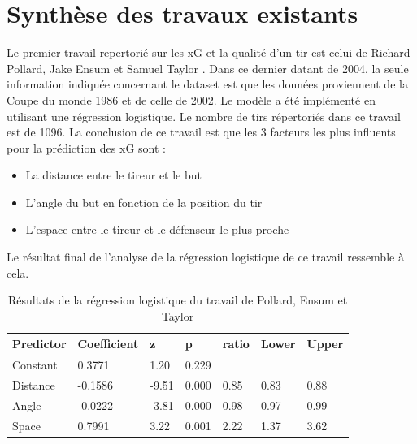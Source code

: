 \documentclass[12pt]{article}
\begin{document}
\newpage
\section{Synthèse des travaux existants}
\label{sec:synthese}
Le premier travail repertorié sur les xG et la qualité d'un tir est celui de Richard Pollard, Jake Ensum et Samuel Taylor \cite{pollardEstimatingProbabilityShot2004}.
Dans ce dernier datant de 2004, la seule information indiquée concernant le dataset est que les données proviennent de la Coupe du monde 1986 et de celle de 2002.
Le modèle a été implémenté en utilisant une régression logistique.
Le nombre de tirs répertoriés dans ce travail est de 1096.
La conclusion de ce travail est que les 3 facteurs les plus influents pour la prédiction des xG sont :
\begin{itemize}
    \item La distance entre le tireur et le but
    \item L'angle du but en fonction de la position du tir
    \item L'espace entre le tireur et le défenseur le plus proche
\end{itemize}
Le résultat final de l'analyse de la régression logistique de ce travail ressemble à cela.
\begin{table}[htp]
    \centering
    \begin{tabular}{|l|l|l|l|l|l|l|}
        \hline
        \textbf{Predictor} & \textbf{Coefficient} & \textbf{z} & \textbf{p} & \textbf{ratio} & \textbf{Lower} & \textbf{Upper} \\ \hline
        Constant           & 0.3771               & 1.20       & 0.229      &                &                &                \\ \hline
        Distance           & -0.1586              & -9.51      & 0.000      & 0.85           & 0.83           & 0.88           \\ \hline
        Angle              & -0.0222              & -3.81      & 0.000      & 0.98           & 0.97           & 0.99           \\ \hline
        Space              & 0.7991               & 3.22       & 0.001      & 2.22           & 1.37           & 3.62           \\ \hline
    \end{tabular}
    \caption{Résultats de la régression logistique du travail de Pollard, Ensum et Taylor}
\end{table}
\end{document}
